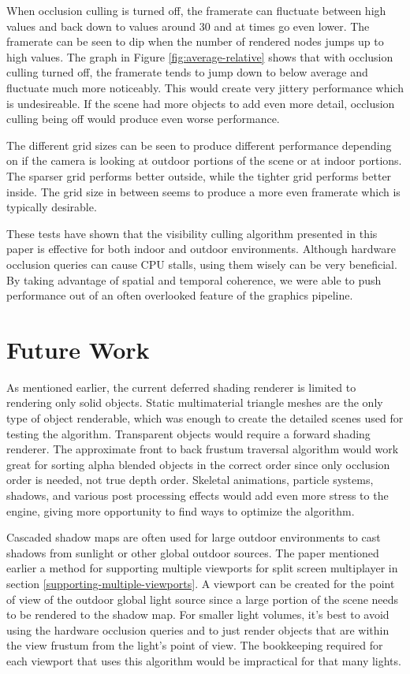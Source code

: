 \documentclass[12pt]{ucthesis}
\begin{document}
When occlusion culling is turned off, the framerate can fluctuate between high values and back down to values around 30 and at times go even lower.
The framerate can be seen to dip when the number of rendered nodes jumps up to high values.
The graph in Figure \ref{fig:average-relative} shows that with occlusion culling turned off, the framerate tends to jump down to below average and fluctuate much more noticeably.
This would create very jittery performance which is undesireable.
If the scene had more objects to add even more detail, occlusion culling being off would produce even worse performance.

The different grid sizes can be seen to produce different performance depending on if the camera is looking at outdoor portions of the scene or at indoor portions.
The sparser grid performs better outside, while the tighter grid performs better inside.
The grid size in between seems to produce a more even framerate which is typically desirable.

These tests have shown that the visibility culling algorithm presented in this paper is effective for both indoor and outdoor environments.
Although hardware occlusion queries can cause CPU stalls, using them wisely can be very beneficial.
By taking advantage of spatial and temporal coherence, we were able to push performance out of an often overlooked feature of the graphics pipeline.

\chapter{Future Work}
\label{future-work}
As mentioned earlier, the current deferred shading renderer is limited to rendering only solid objects.
Static multimaterial triangle meshes are the only type of object renderable, which was enough to create the detailed scenes used for testing the algorithm.
Transparent objects would require a forward shading renderer.
The approximate front to back frustum traversal algorithm would work great for sorting alpha blended objects in the correct order since only occlusion order is needed, not true depth order.
Skeletal animations, particle systems, shadows, and various post processing effects would add even more stress to the engine, giving more opportunity to find ways to optimize the algorithm.

Cascaded shadow maps are often used for large outdoor environments to cast shadows from sunlight or other global outdoor sources.\cite{ms-cascaded-shadow}
The paper mentioned earlier a method for supporting multiple viewports for split screen multiplayer in section \ref{supporting-multiple-viewports}.
A viewport can be created for the point of view of the outdoor global light source since a large portion of the scene needs to be rendered to the shadow map.
For smaller light volumes, it's best to avoid using the hardware occlusion queries and to just render objects that are within the view frustum from the light's point of view.
The bookkeeping required for each viewport that uses this algorithm would be impractical for that many lights.
\end{document}
